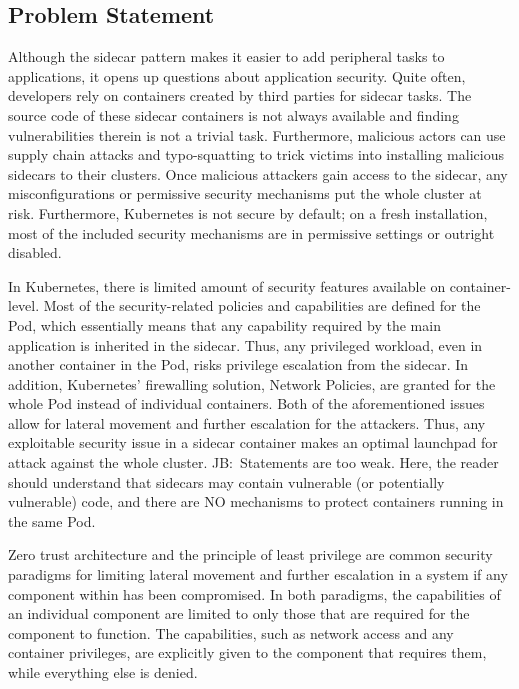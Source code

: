 \documentclass[english, 12pt, a4paper, sci, utf8, a-2b, online]{aaltothesis}
\newcommand{\mycomment}[3]{\textcolor{#1}{#2:~#3}}
\newcommand{\jb}[1]{\noindent\mycomment{aaltoRed}{JB}{#1}}
\begin{document}
\subsection{Problem Statement}

Although the sidecar pattern makes it easier to add peripheral tasks to applications, it opens up questions about application security. Quite often, developers rely on containers created by third parties for sidecar tasks. The source code of these sidecar containers is not always available and finding vulnerabilities therein is not a trivial task. Furthermore, malicious actors can use supply chain attacks and typo-squatting to trick victims into installing malicious sidecars to their clusters. Once malicious attackers gain access to the sidecar, any misconfigurations or permissive security mechanisms put the whole cluster at risk. Furthermore, Kubernetes is not secure by default; on a fresh installation, most of the included security mechanisms are in permissive settings or outright disabled.

In Kubernetes, there is limited amount of security features available on container-level. Most of the security-related policies and capabilities are defined for the Pod, which essentially means that any capability required by the main application is inherited in the sidecar. Thus, any privileged workload, even in another container in the Pod, risks privilege escalation from the sidecar. In addition, Kubernetes' firewalling solution, Network Policies, are granted for the whole Pod instead of individual containers. Both of the aforementioned issues allow for lateral movement and further escalation for the attackers. Thus, any exploitable security issue in a sidecar container makes an optimal launchpad for attack against the whole cluster.
\jb{Statements are too weak. Here, the reader should understand that sidecars may contain vulnerable (or potentially vulnerable) code, and there are NO mechanisms to protect containers running in the same Pod.}

Zero trust architecture and the principle of least privilege are common security paradigms for limiting lateral movement and further escalation in a system if any component within has been compromised. In both paradigms, the capabilities of an individual component are limited to only those that are required for the component to function. The capabilities, such as network access and any container privileges, are explicitly given to the component that requires them, while everything else is denied.
\end{document}
